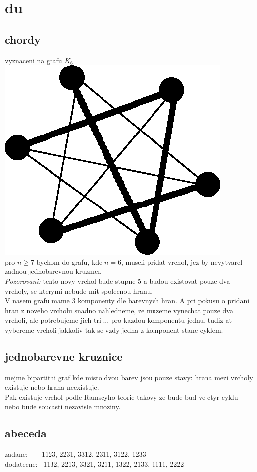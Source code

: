 \documentclass[a4paper]{article}
\begin{document}
\pagestyle{fancy}

\setcounter{section}{3}
\section{du}
\subsection{chordy}
vyznaceni na grafu $K_6$\\
\includegraphics[width=.3\textwidth]{chords.png}\\
pro $n\geq7$ bychom do grafu, kde $n=6$, museli pridat vrchol,
jez by nevytvarel zadnou jednobarevnou kruznici.\\
\textit{Pozorovani:} tento novy vrchol bude stupne 5
a budou existovat pouze dva vrcholy,
se kterymi nebude mit spolecnou hranu.\\
V nasem grafu mame 3 komponenty dle barevnych hran.
A pri pokusu o pridani hran z noveho vrcholu snadno nahledneme,
ze muzeme vynechat pouze dva vrcholi, ale potrebujeme jich tri ... 
pro kazdou komponentu jednu, tudiz at vybereme vrcholi jakkoliv tak
se vzdy jedna z komponent stane cyklem.


\subsection{jednobarevne kruznice}
mejme bipartitni graf kde misto dvou barev jsou pouze stavy:
hrana mezi vrcholy existuje nebo hrana neexistuje.\\
Pak existuje vrchol podle Ramseyho teorie takovy ze bude bud
ve ctyr-cyklu nebo bude soucasti nezavisle mnoziny. 


\subsection{abeceda}
zadane: ~ ~	1123, 2231, 3312, 2311, 3122, 1233\\
dodatecne:~	1132, 2213, 3321, 3211, 1322, 2133, 1111, 2222
\end{document}
